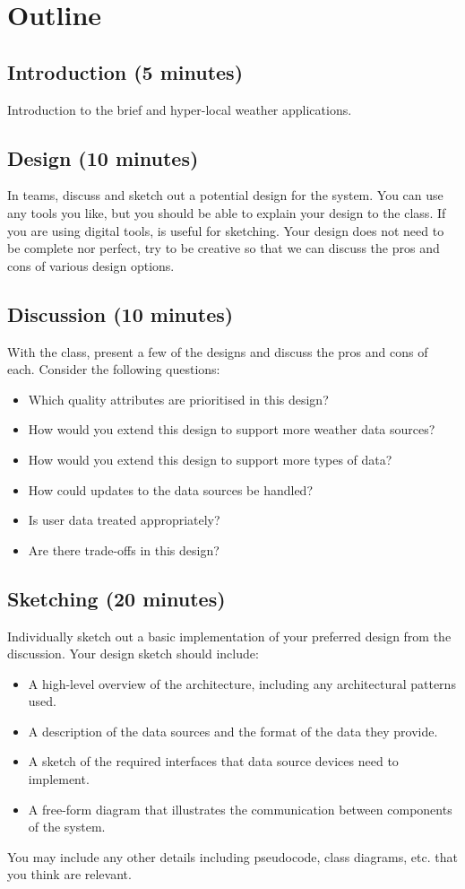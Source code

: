 \documentclass{csse4400}
\begin{document}
\section{Outline}

\subsection*{Introduction (5 minutes)}
Introduction to the brief and hyper-local weather applications.

\subsection*{Design (10 minutes)}
In teams, discuss and sketch out a potential design for the system.
You can use any tools you like, but you should be able to explain your design to the class.
If you are using digital tools,  is useful for sketching.
Your design does not need to be complete nor perfect,
try to be creative so that we can discuss the pros and cons of various design options.

\subsection*{Discussion (10 minutes)}
With the class, present a few of the designs and discuss the pros and cons of each.
Consider the following questions:
\begin{itemize}
\item Which quality attributes are prioritised in this design?
\item How would you extend this design to support more weather data sources?
\item How would you extend this design to support more types of data?
\item How could updates to the data sources be handled?
\item Is user data treated appropriately?
\item Are there trade-offs in this design?
\end{itemize}

\subsection*{Sketching (20 minutes)}
Individually sketch out a basic implementation of your preferred design from the discussion.
Your design sketch should include:
\begin{itemize}
\item A high-level overview of the architecture, including any architectural patterns used.
\item A description of the data sources and the format of the data they provide.
\item A sketch of the required interfaces that data source devices need to implement.
\item A free-form diagram that illustrates the communication between components of the system.
\end{itemize}
You may include any other details including pseudocode, class diagrams, etc. that you think are relevant.
\end{document}
